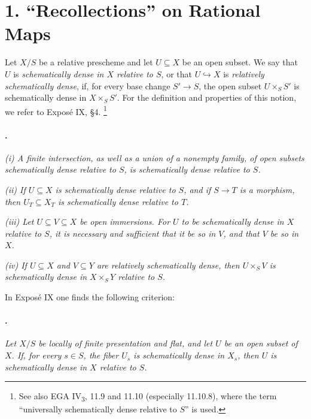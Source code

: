 \section*{1. ``Recollections'' on
Rational Maps}

Let \(X/S\) be a relative prescheme and let \(U\subseteq X\) be an
open subset. We say that \(U\) is \emph{schematically dense in \(X\)
relative to \(S\)}, or that \(U\hookrightarrow X\) is
\emph{relatively schematically dense}, if, for every base change
\(S'\to S\), the open subset \(U\times_S S'\) is schematically dense
in \(X\times_S S'\). For the definition and properties of this
notion, we refer to Exposé IX, \S4.\begingroup
\renewcommand{\thefootnote}{*}\footnote{See also EGA
IV\textsubscript{3}, 11.9 and 11.10 (especially 11.10.8), where the
term ``universally schematically dense relative to \(S\)'' is used.}
\addtocounter{footnote}{-1}
\endgroup

\paragraph{.}
\textit{(i) A finite intersection, as well as a union of a nonempty
family, of open subsets schematically dense relative to \(S\), is
schematically dense relative to \(S\).}

\textit{(ii) If \(U\subseteq X\) is schematically dense relative to
\(S\), and if \(S\to T\) is a morphism, then
\(U_T\subseteq X_T\) is schematically dense relative to \(T\).}

\textit{(iii) Let \(U\subseteq V\subseteq X\) be open immersions. For
\(U\) to be schematically dense in \(X\) relative to \(S\), it is
necessary and sufficient that it be so in \(V\), and that \(V\) be so
in \(X\).}

\textit{(iv) If \(U\subseteq X\) and \(V\subseteq Y\) are relatively
schematically dense, then \(U\times_S V\) is schematically dense in
\(X\times_S Y\) relative to \(S\).}

In Exposé IX one finds the following criterion:

\paragraph{.}
\textit{Let \(X/S\) be locally of finite presentation and flat, and
let \(U\) be an open subset of \(X\). If, for every \(s\in S\), the
fiber \(U_s\) is schematically dense in \(X_s\), then \(U\) is
schematically dense in \(X\) relative to \(S\).}

